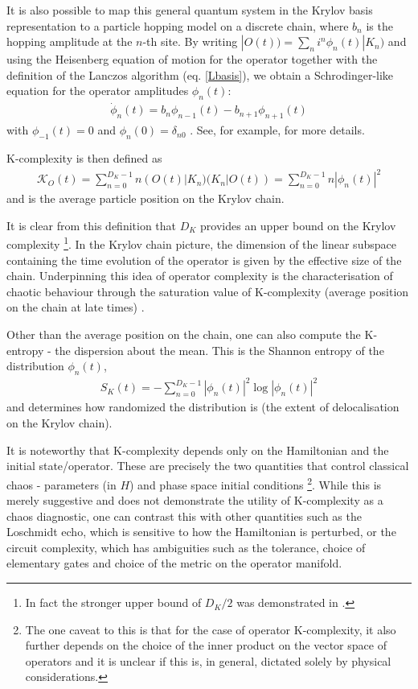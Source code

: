 \documentclass[a4paper,12pt]{article}
\begin{document}
It is also possible to map this general quantum system in the Krylov basis representation to a particle hopping model on a discrete chain, where $b_n$ is the hopping amplitude at the $n$-th site. By writing $|O(t))=\sum_n i^n \phi_n(t)|K_n)$ and using the Heisenberg equation of motion for the operator together with the definition of the Lanczos algorithm (eq. \eqref{Lbasis}), we obtain a Schrodinger-like equation for the operator amplitudes $\phi_n(t)$:
\begin{align} \label{KCh}
\dot{\phi}_n(t)= b_n \phi_{n-1}(t)-b_{n+1}\phi_{n+1}(t)
\end{align}
with $\phi_{-1}(t)=0$ and $\phi_n(0)=\delta_{n0} $ . See, for example, \cite{Parker_2019, geometry, Rabinovici_2022} for more details.

K-complexity is then defined as 
\begin{align}   
\mathcal{K}_O(t)=\sum_{n=0}^{D_K-1} n (O(t)|K_n)(K_n|O(t))=\sum_{n=0}^{D_K-1} n |\phi_n(t)|^2
\end{align}
and is the average particle position on the Krylov chain.

It is clear from this definition that $D_K$ provides an upper bound on the Krylov complexity \footnote{In fact the stronger upper bound of $D_K/2$ was demonstrated in \cite{Rabinovici_2021}.}.
In the Krylov chain picture, the dimension of the linear subspace containing the time evolution of the operator is given by the effective size of the chain. Underpinning this idea of operator complexity is the characterisation of chaotic behaviour through the saturation value of K-complexity (average position on the chain at late times) \cite{Rabinovici_2022, Rabinovici_2021}.

Other than the average position on the chain, one can also compute the K-entropy \cite{Rabinovici:2019wsy} - the dispersion about the mean. This is the Shannon entropy of the distribution $\phi_n(t)$,
\begin{align}
S_K(t)=-\sum_{n=0}^{D_K -1} |\phi_n(t)|^2 \log |\phi_n(t)|^2 
\end{align}
and determines how randomized the distribution is (the extent of delocalisation on the Krylov chain).

It is noteworthy that K-complexity depends only on the Hamiltonian and the initial state/operator. These are precisely the two quantities that control classical chaos - parameters (in $H$) and phase space initial conditions \footnote{The one caveat to this is that for the case of operator K-complexity, it also further depends on the choice of the inner product on the vector space of operators and it is unclear if this is, in general, dictated solely by physical considerations.}.
  While this is merely suggestive and does not demonstrate the utility of K-complexity as a chaos diagnostic, one can contrast this with other quantities such as the Loschmidt echo, which is sensitive to how the Hamiltonian is perturbed, or the circuit complexity,
which has ambiguities such as the tolerance, choice of elementary gates and choice of the metric on the operator manifold.
\end{document}
